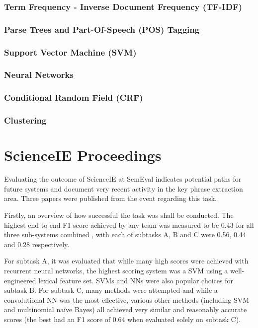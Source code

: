 \subsubsection*{Term Frequency - Inverse Document Frequency (TF-IDF)}

\subsubsection*{Parse Trees and Part-Of-Speech (POS) Tagging}

\subsubsection*{Support Vector Machine (SVM)}

\subsubsection*{Neural Networks}

\subsubsection*{Conditional Random Field (CRF)}

\subsubsection*{Clustering}

\section{ScienceIE Proceedings}
Evaluating the outcome of ScienceIE at SemEval indicates potential paths for future systems and document very recent activity in the key phrase extraction area. Three papers were published from the event regarding this task.

Firstly, an overview of how successful the task was shall be conducted. The highest end-to-end F1 score achieved by any team was measured to be 0.43 for all three sub-systems combined \cite{Augenstein2017}, with each of subtasks A, B and C were 0.56, 0.44 and 0.28 respectively. 

For subtask A, it was evaluated that while many high scores were achieved with recurrent neural networks, the highest scoring system was a SVM using a well-engineered lexical feature set. SVMs and NNs were also popular choices for subtask B. For subtask C, many methods were attempted and while a convolutional NN was the most effective, various other methods (including SVM and multinomial naïve Bayes) all achieved very similar and reasonably accurate scores (the best had an F1 score of 0.64 when evaluated solely on subtask C).

